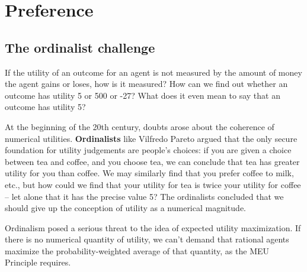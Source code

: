 \chapter{Preference}\label{ch:preference}

%

\section{The ordinalist challenge}

If the utility of an outcome for an agent is not measured by the
amount of money the agent gains or loses, how is it measured? How can
we find out whether an outcome has utility 5 or 500 or -27? What does
it even mean to say that an outcome has utility 5?

At the beginning of the 20th century, doubts arose about the coherence
of numerical utilities. \textbf{Ordinalists} like Vilfredo Pareto
argued that the only secure foundation for utility judgements are
people's choices: if you are given a choice between tea and coffee,
and you choose tea, we can conclude that tea has greater utility for
you than coffee. We may similarly find that you prefer coffee to milk,
etc., but how could we find that your utility for tea is twice your
utility for coffee -- let alone that it has the precise value 5? The
ordinalists concluded that we should give up the conception of utility
as a numerical magnitude.


Ordinalism posed a serious threat to the idea of expected utility
maximization. If there is no numerical quantity of utility, we can't
demand that rational agents maximize the probability-weighted average
of that quantity, as the MEU Principle requires.

